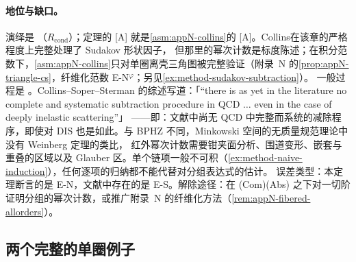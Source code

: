 \paragraph{地位与缺口。}演绎是 \tagR（$R_{\mathrm{cond}}$）；定理的 [A] 就是\cref{asm:appN-collins}的 [A]。Collins\cite[第~10.3、10.8~节]{Collins2011}在该章的严格程度上完整处理了 Sudakov 形状因子，
但那里的幂次计数是标度陈述；在积分范数下，\cref{asm:appN-collins}只对单圈离壳三角图被完整验证（附录~N 的\cref{prop:appN-triangle-cs}，纤维化范数 E-N$^\varphi$；另见\cref{ex:method-sudakov-subtraction}）。
一般过程是 \tagA。Collins--Soper--Sterman 的综述写道：「“there is as yet in the literature no complete and systematic subtraction procedure in QCD $\ldots$ even in the case of deeply inelastic scattering”」
\cite[第~10.1~节]{CollinsSoperSterman1989}——即：文献中尚无 QCD 中完整而系统的减除程序，即使对 DIS 也是如此。与 BPHZ 不同，Minkowski 空间的无质量规范理论中没有 Weinberg 定理的类比，
红外幂次计数需要钳夹面分析、围道变形、嵌套与重叠的区域以及 Glauber 区。单个链项一般不可积（\cref{ex:method-naive-induction}），任何逐项的归纳都不能代替对分组表达式的估计。
误差类型：本定理断言的是 E-N，文献中存在的是 E-S。解除途径：在 (Com)(Abs) 之下对一切阶证明分组的幂次计数，或推广附录~N 的纤维化方法（\cref{rem:appN-fibered-allorders}）。

\subsection{两个完整的单圈例子}

